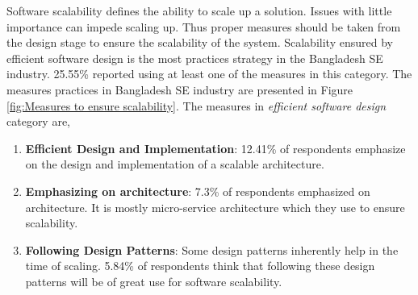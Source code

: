  Software scalability defines the ability to scale up a solution. Issues with little importance can impede scaling up. Thus proper measures should be taken from the design stage to ensure the scalability of the system. Scalability ensured by efficient software design is the most practices strategy in the Bangladesh SE industry. 25.55\% reported using at least one of the measures in this category. The measures practices in Bangladesh SE industry are presented in Figure \ref{fig:Measures to ensure scalability}. The measures in \emph{efficient software design} category are,
 \begin{enumerate}[label=(\alph*)]
 
     \item \textbf{Efficient Design and Implementation}: 12.41\% of respondents emphasize on the design and implementation of a scalable architecture. 
    
     \item \textbf{Emphasizing on architecture}: 7.3\% of respondents emphasized on architecture. It is mostly micro-service architecture which they use to ensure scalability.

    
    \item \textbf{Following Design Patterns}: Some design patterns inherently help in the time of scaling. 5.84\% of respondents think that following these design patterns will be of great use for software scalability.
 
 \end{enumerate}
 
